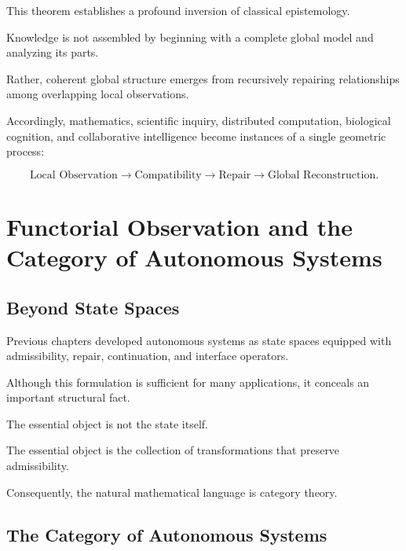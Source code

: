 \documentclass[11pt,oneside]{book}
\numberwithin{equation}{chapter}
\theoremstyle{definition}
\theoremstyle{plain}
\begin{document}
This theorem establishes a profound inversion of classical epistemology.

Knowledge is not assembled by beginning with a complete global model and
analyzing its parts.

Rather, coherent global structure emerges from recursively repairing
relationships among overlapping local observations.

Accordingly, mathematics, scientific inquiry, distributed computation,
biological cognition, and collaborative intelligence become instances of a
single geometric process:

\[
\boxed{
\text{Local Observation}
\rightarrow
\text{Compatibility}
\rightarrow
\text{Repair}
\rightarrow
\text{Global Reconstruction}.
}
\]

\chapter{Functorial Observation and the Category of Autonomous Systems}

\section{Beyond State Spaces}

Previous chapters developed autonomous systems as state spaces equipped with
admissibility, repair, continuation, and interface operators.

Although this formulation is sufficient for many applications, it conceals an
important structural fact.

The essential object is not the state itself.

The essential object is the collection of transformations that preserve
admissibility.

Consequently, the natural mathematical language is category theory.

\section{The Category of Autonomous Systems}
\end{document}
